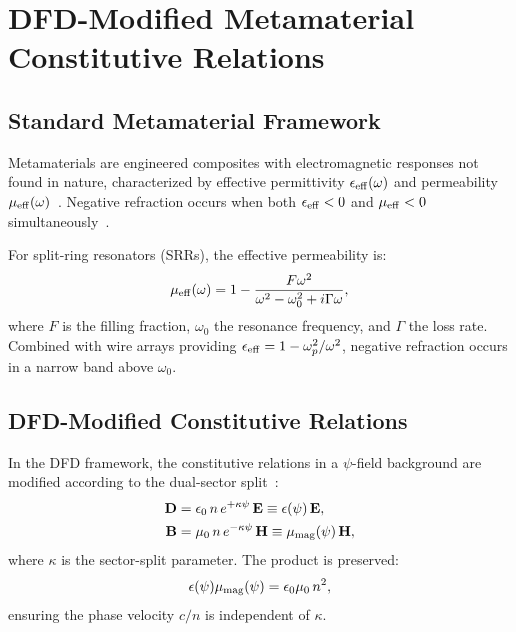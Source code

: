 \documentclass[aps,prb,twocolumn,superscriptaddress,floatfix,nofootinbib,longbibliography]{revtex4-2}
\begin{document}
\section{DFD-Modified Metamaterial Constitutive Relations}\label{sec:metamaterials}

\subsection{Standard Metamaterial Framework}

Metamaterials are engineered composites with electromagnetic responses
not found in nature, characterized by effective permittivity
$\epsilon_{\rm eff}(\omega)$ and permeability
$\mu_{\rm eff}(\omega)$~\cite{Pendry1999,Smith2000,Shelby2001}.
Negative refraction occurs when both $\epsilon_{\rm eff} < 0$ and
$\mu_{\rm eff} < 0$ simultaneously~\cite{Veselago1968}.

For split-ring resonators (SRRs), the effective permeability is:
\begin{equation}
\mu_{\rm eff}(\omega) = 1 - \frac{F\omega^2}{\omega^2 - \omega_0^2
+ i\Gamma\omega},
\label{eq:srr-mu}
\end{equation}
where $F$ is the filling fraction, $\omega_0$ the resonance frequency,
and $\Gamma$ the loss rate.  Combined with wire arrays providing
$\epsilon_{\rm eff} = 1 - \omega_p^2/\omega^2$, negative refraction
occurs in a narrow band above $\omega_0$.

\subsection{DFD-Modified Constitutive Relations}

In the DFD framework, the constitutive relations in a $\psi$-field
background are modified according to the dual-sector
split~\cite{Alcock2025EM}:
\begin{align}
\mathbf{D} &= \epsilon_0\,n\,e^{+\kappa\psi}\,\mathbf{E}
\equiv \epsilon(\psi)\,\mathbf{E}, \label{eq:D-psi}\\
\mathbf{B} &= \mu_0\,n\,e^{-\kappa\psi}\,\mathbf{H}
\equiv \mu_{\rm mag}(\psi)\,\mathbf{H}, \label{eq:B-psi}
\end{align}
where $\kappa$ is the sector-split parameter.  The product is preserved:
\begin{equation}
\epsilon(\psi)\mu_{\rm mag}(\psi) = \epsilon_0\mu_0\,n^2,
\label{eq:product-preserve}
\end{equation}
ensuring the phase velocity $c/n$ is independent of $\kappa$.
\end{document}
